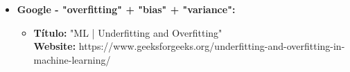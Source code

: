 \documentclass{article}
\begin{document}
\begin{itemize}
      \item \textbf{Google - "overfitting" + "bias" + "variance":}
        \begin{itemize}
            \item \textbf{Título: }"ML | Underfitting and Overfitting"\\
            \textbf{Website:} https://www.geeksforgeeks.org/underfitting-and-overfitting-in-machine-learning/

        \end{itemize}
    \end{itemize}
  
\end{document}
